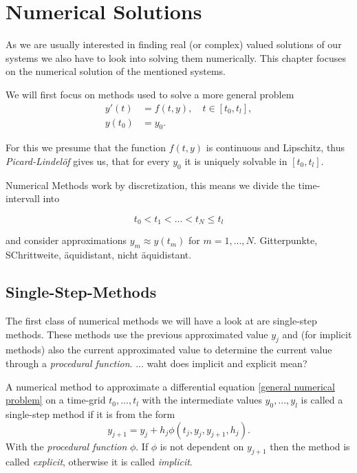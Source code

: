 \chapter{Numerical Solutions}
As we are usually interested in finding real (or complex) valued solutions of our systems we also have to look into solving them numerically. This chapter focuses on the numerical solution of the mentioned systems.

We will first focus on methods used to solve a more general problem
\begin{align}
	\label{general numerical problem}
	y'(t) &= f(t,y), \quad t \in [t_0, t_l], \\
	y(t_0) &= y_0.
\end{align}


For this we presume that the function $f(t,y)$ is continuous and Lipschitz, thus \emph{Picard-Lindelöf} gives us, that for every $y_0$ it is uniquely solvable in $[t_0, t_l]$.

Numerical Methods work by discretization, this means we divide the time-intervall into

\begin{displaymath}
	t_0 < t_1 < ... < t_N \leq t_l
\end{displaymath}

and consider approximations $y_m \approx y(t_m)$ for $m=1,...,N$. Gitterpunkte, SChrittweite, äquidistant, nicht äquidistant.

\section{Single-Step-Methods}
	The first class of numerical methods we will have a look at are single-step methods. These methods use the previous approximated value $y_j$ and (for implicit methods) also the current approximated value to determine the current value through a \emph{procedural function}. ... waht does implicit and explicit mean?
	
	\begin{definition}
		A numerical method to approximate a differential equation \ref{general numerical problem} on a time-grid $t_0,...,t_l$ with the intermediate values $y_0,...,y_l$ is called a single-step method if it is from the form
		\begin{equation}
			\label{single-step method}
			y_{j+1} = y_j + h_j \phi(t_j,y_j, y_{j+1},h_j).
		\end{equation}
		With the \emph{procedural function} $\phi$. If $\phi$ is not dependent on $y_{j+1}$ then the method is called \emph{explicit}, otherwise it is called \emph{implicit}.
	\end{definition}

